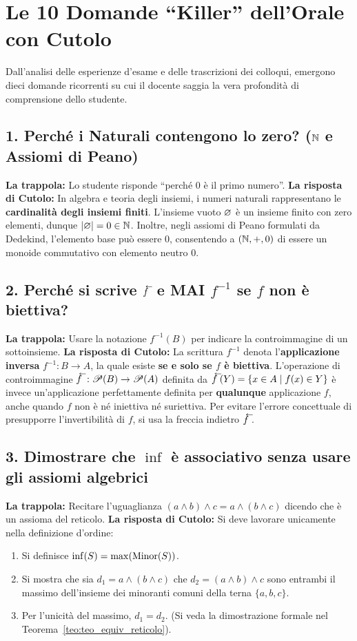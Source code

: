 \section{Le 10 Domande ``Killer'' dell'Orale con Cutolo}

Dall'analisi delle esperienze d'esame e delle trascrizioni dei colloqui, emergono dieci domande ricorrenti su cui il docente saggia la vera profondità di comprensione dello studente.

\subsection{1. Perché i Naturali contengono lo zero? ($\mathbb{N}$ e Assiomi di Peano)}
\textbf{La trappola:} Lo studente risponde ``perché $0$ è il primo numero''.
\textbf{La risposta di Cutolo:} In algebra e teoria degli insiemi, i numeri naturali rappresentano le \textbf{cardinalità degli insiemi finiti}. L'insieme vuoto $\varnothing$ è un insieme finito con zero elementi, dunque $|\varnothing| = 0 \in \mathbb{N}$.
Inoltre, negli assiomi di Peano formulati da Dedekind, l'elemento base può essere $0$, consentendo a $(\mathbb{N}, +, 0)$ di essere un monoide commutativo con elemento neutro $0$.

\subsection{2. Perché si scrive $\antivecf$ e MAI $f^{-1}$ se $f$ non è biettiva?}
\textbf{La trappola:} Usare la notazione $f^{-1}(B)$ per indicare la controimmagine di un sottoinsieme.
\textbf{La risposta di Cutolo:} La scrittura $f^{-1}$ denota l'\textbf{applicazione inversa} $f^{-1}: B \to A$, la quale esiste \textbf{se e solo se $f$ è biettiva}.
L'operazione di controimmagine $\antivecf: \P(B) \to \P(A)$ definita da $\antivecf(Y) = \{x \in A \mid f(x) \in Y\}$ è invece un'applicazione perfettamente definita per \textbf{qualunque} applicazione $f$, anche quando $f$ non è né iniettiva né suriettiva. Per evitare l'errore concettuale di presupporre l'invertibilità di $f$, si usa la freccia indietro $\antivecf$.

\subsection{3. Dimostrare che $\inf$ è associativo senza usare gli assiomi algebrici}
\textbf{La trappola:} Recitare l'uguaglianza $(a \wedge b) \wedge c = a \wedge (b \wedge c)$ dicendo che è un assioma del reticolo.
\textbf{La risposta di Cutolo:} Si deve lavorare unicamente nella definizione d'ordine:
\begin{enumerate}
    \item Si definisce $\inf(S) = \max(\operatorname{Minor}(S))$.
    \item Si mostra che sia $d_1 = a \wedge (b \wedge c)$ che $d_2 = (a \wedge b) \wedge c$ sono entrambi il massimo dell'insieme dei minoranti comuni della terna $\{a, b, c\}$.
    \item Per l'unicità del massimo, $d_1 = d_2$. (Si veda la dimostrazione formale nel Teorema~\ref{teo:teo_equiv_reticolo}).
\end{enumerate}


